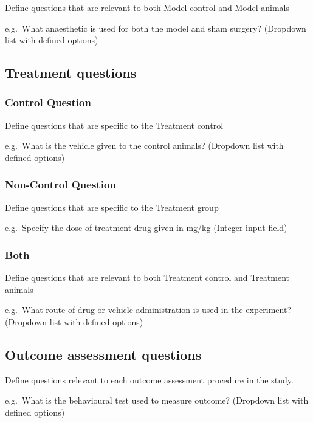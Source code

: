 \documentclass[
]{book}
\begin{document}
Define questions that are relevant to both Model control and Model animals

e.g.~What anaesthetic is used for both the model and sham surgery?
(Dropdown list with defined options)

\hypertarget{treatment-questions}{%
\subsection{Treatment questions}\label{treatment-questions}}

\hypertarget{control-question-1}{%
\subsubsection{Control Question}\label{control-question-1}}

Define questions that are specific to the Treatment control

e.g.~What is the vehicle given to the control animals?
(Dropdown list with defined options)

\hypertarget{non-control-question-1}{%
\subsubsection{Non-Control Question}\label{non-control-question-1}}

Define questions that are specific to the Treatment group

e.g.~Specify the dose of treatment drug given in mg/kg
(Integer input field)

\hypertarget{both-1}{%
\subsubsection{Both}\label{both-1}}

Define questions that are relevant to both Treatment control and Treatment animals

e.g.~What route of drug or vehicle administration is used in the experiment?
(Dropdown list with defined options)

\hypertarget{outcome-assessment-questions}{%
\subsection{Outcome assessment questions}\label{outcome-assessment-questions}}

Define questions relevant to each outcome assessment procedure in the study.

e.g.~What is the behavioural test used to measure outcome?
(Dropdown list with defined options)
\end{document}
